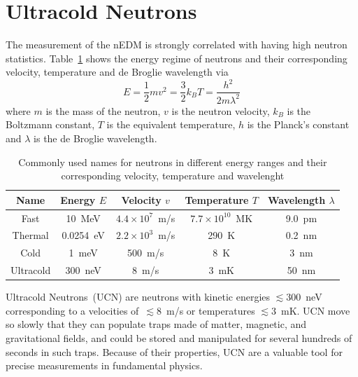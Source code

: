 \section{Ultracold Neutrons}
The measurement of the nEDM is strongly correlated with having high
neutron statistics. Table~\ref{tab:ucnenergy} shows the energy regime
of neutrons and their corresponding velocity, temperature and de
Broglie wavelength via
\begin{equation}
  \label{eqn:ucnenergy}
  E = \frac{1}{2} m v^2 = \frac{3}{2} k_B T = \frac{h^2}{2m \lambda^2}
\end{equation}
where $m$ is the mass of the neutron, $v$ is the neutron velocity,
$k_B$ is the Boltzmann constant, $T$ is the equivalent temperature,
$h$ is the Planck's constant and $\lambda$ is the de Broglie
wavelength.

\begin{table}
  \label{tab:ucnenergy}
  \centering
  \begin{tabular}{|c|c|c|c|c|}
    \hline
    Name & Energy $E$ & Velocity $v$ & Temperature $T$ & Wavelength $\lambda$ \\
    \hline
    \hline
    Fast & 10~MeV & $4.4 \times 10^7$~m/s & $7.7 \times 10^{10}$~MK & 9.0~pm \\
    \hline
    Thermal & 0.0254~eV & $ 2.2 \times 10^3$~m/s & 290~K & 0.2~nm \\
    \hline
    Cold & 1~meV & 500~m/s & 8~K & 3~nm \\
    \hline
    Ultracold & 300~neV & 8~m/s & 3~mK & 50~nm \\
    \hline
  \end{tabular}
  \caption{Commonly used names for neutrons in different energy ranges
    and their corresponding velocity, temperature and wavelenght}
\end{table}



Ultracold Neutrons~(UCN) are neutrons with kinetic energies
$\lesssim 300$~neV corresponding to a velocities of~$\lesssim 8$~m/s or
temperatures $\lesssim 3$~mK. UCN move so slowly that they can
populate traps made of matter, magnetic, and gravitational fields, and
could be stored and manipulated for several hundreds of seconds in such
traps. Because of their properties, UCN are a valuable tool for precise
measurements in fundamental physics.


